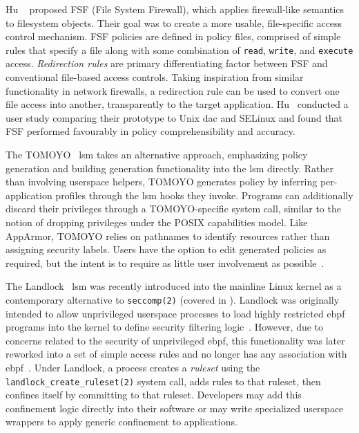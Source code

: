 Hu \etal~\cite{hu2013_fsf} proposed FSF (File System Firewall), which applies
firewall-like semantics to filesystem objects. Their goal was to create a more usable,
file-specific access control mechanism. FSF policies are defined in policy files,
comprised of simple rules that specify a file along with some combination of
\texttt{read}, \texttt{write}, and \texttt{execute} access. \textit{Redirection rules} are
primary differentiating factor between FSF and conventional file-based access controls.
Taking inspiration from similar functionality in network firewalls, a redirection rule can
be used to convert one file access into another, transparently to the target application.
Hu \etal~conducted a user study comparing their prototype to Unix \gls{dac} and SELinux
and found that FSF performed favourably in policy comprehensibility and accuracy.

The TOMOYO~\cite{harada2004_tomoyo} \gls{lsm} takes an alternative approach, emphasizing
policy generation and building generation functionality into the \gls{lsm} directly.
Rather than involving userspace helpers, TOMOYO generates policy by inferring
per-application profiles through the \gls{lsm} hooks they invoke. Programs can
additionally discard their privileges through a TOMOYO-specific system call, similar to
the notion of dropping privileges under the POSIX capabilities model. Like AppArmor,
TOMOYO relies on pathnames to identify resources rather than assigning security labels.
Users have the option to edit generated policies as required, but the intent is to require
as little user involvement as possible~\cite{harada2004_tomoyo}.

The Landlock~\cite{salaun_landlockio, salaun_landlock_patch} \gls{lsm} was recently
introduced into the mainline Linux kernel as a contemporary alternative to
\texttt{seccomp(2)} (covered in ). Landlock was originally intended to
allow unprivileged userspace processes to load highly restricted \gls{ebpf} programs into
the kernel to define security filtering logic~\cite{salaun_landlock_patch}. However, due
to concerns related to the security of unprivileged \gls{ebpf}, this functionality was
later reworked into a set of simple access rules and no longer has any association with
\gls{ebpf}~\cite{salaun_landlockio}. Under Landlock, a process creates a \textit{ruleset}
using the \texttt{landlock\_create\_ruleset(2)} system call, adds rules to that ruleset,
then confines itself by committing to that ruleset. Developers may add this confinement
logic directly into their software or may write specialized userspace wrappers to apply
generic confinement to applications.

